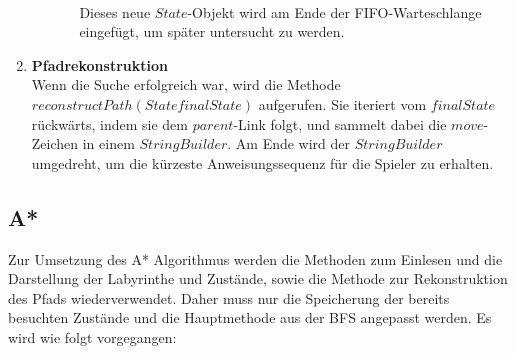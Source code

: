 \documentclass[a4paper,10pt,ngerman]{scrartcl}
\begin{document}
\begin{enumerate}
\begin{enumerate}
\begin{enumerate}
      \\ Dieses neue $State$-Objekt wird am Ende der FIFO-Warteschlange eingefügt, um später untersucht zu werden. 
    \end{enumerate}
  \end{enumerate}
  \item \textbf{Pfadrekonstruktion}\\
  Wenn die Suche erfolgreich war, wird die Methode $reconstructPath(State finalState)$ aufgerufen. Sie iteriert vom $finalState$ rückwärts, indem sie dem $parent$-Link folgt, und sammelt dabei die $move$-Zeichen in einem $StringBuilder$. Am Ende wird der $StringBuilder$ umgedreht, um die kürzeste Anweisungssequenz für die Spieler zu erhalten. 

\end{enumerate}

\subsection{A*}
Zur Umsetzung des A* Algorithmus werden die Methoden zum Einlesen und die Darstellung der La\-byrinthe und Zustände, sowie die Methode zur Rekonstruktion des Pfads wiederverwendet. Daher muss nur die Speicherung der bereits besuchten Zustände und die Hauptmethode aus der BFS angepasst werden. Es wird wie folgt vorgegangen: 
\end{document}

